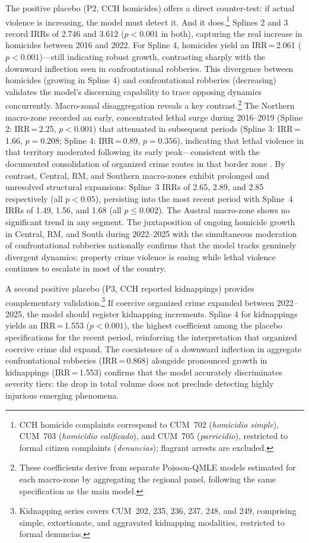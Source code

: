 \documentclass[pdflatex,sn-basic]{sn-jnl}
\begin{document}
The positive placebo (P2, CCH homicides) offers a direct counter-test: if actual violence is increasing, the model must detect it. And it does.\footnote{CCH homicide complaints correspond to CUM~702 (\textit{homicidio simple}), CUM~703 (\textit{homicidio calificado}), and CUM~705 (\textit{parricidio}), restricted to formal citizen complaints (\textit{denuncias}); flagrant arrests are excluded.} Splines 2 and 3 record IRRs of 2.746 and 3.612 ($p<0.001$ in both), capturing the real increase in homicides between 2016 and 2022. For Spline 4, homicides yield an IRR\,=\,2.061 ($p<0.001$)---still indicating robust growth, contrasting sharply with the downward inflection seen in confrontational robberies. This divergence between homicides (growing in Spline 4) and confrontational robberies (decreasing) validates the model's discerning capability to trace opposing dynamics concurrently. Macro-zonal disaggregation reveals a key contrast.\footnote{These coefficients derive from separate Poisson-QMLE models estimated for each macro-zone by aggregating the regional panel, following the same specification as the main model.} The Northern macro-zone recorded an early, concentrated lethal surge during 2016--2019 (Spline 2: IRR\,=\,2.25, $p<0.001$) that attenuated in subsequent periods (Spline 3: IRR\,=\,1.66, $p=0.208$; Spline 4: IRR\,=\,0.89, $p=0.356$), indicating that lethal violence in that territory moderated following its early peak---consistent with the documented consolidation of organized crime routes in that border zone \citep{bravo2024}. By contrast, Central, RM, and Southern macro-zones exhibit prolonged and unresolved structural expansions: Spline~3 IRRs of 2.65, 2.89, and 2.85 respectively (all $p<0.05$), persisting into the most recent period with Spline~4 IRRs of 1.49, 1.56, and 1.68 (all $p\leq0.002$). The Austral macro-zone shows no significant trend in any segment. The juxtaposition of ongoing homicide growth in Central, RM, and South during 2022--2025 with the simultaneous moderation of confrontational robberies nationally confirms that the model tracks genuinely divergent dynamics: property crime violence is easing while lethal violence continues to escalate in most of the country.

A second positive placebo (P3, CCH reported kidnappings) provides complementary validation.\footnote{Kidnapping series covers CUM~202, 235, 236, 237, 248, and 249, comprising simple, extortionate, and aggravated kidnapping modalities, restricted to formal denuncias.} If coercive organized crime expanded between 2022--2025, the model should register kidnapping increments. Spline 4 for kidnappings yields an IRR\,=\,1.553 ($p<0.001$), the highest coefficient among the placebo specifications for the recent period, reinforcing the interpretation that organized coercive crime did expand. The coexistence of a downward inflection in aggregate confrontational robberies (IRR\,=\,0.868) alongside pronounced growth in kidnappings (IRR\,=\,1.553) confirms that the model accurately discriminates severity tiers: the drop in total volume does not preclude detecting highly injurious emerging phenomena.
\end{document}
